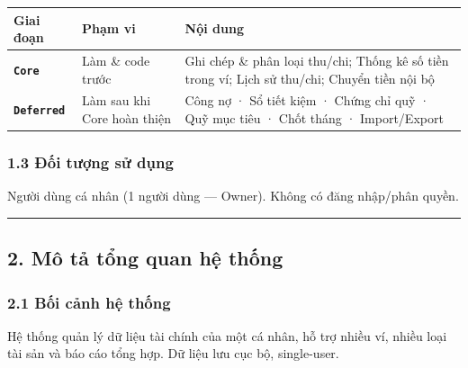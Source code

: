 \documentclass[11pt,a4paper]{article}
\newcounter{none}
\newcommand{\faintline}{\noalign{\global\arrayrulecolor{faintgray}}\hline\noalign{\global\arrayrulecolor{black}}} %
\begin{document}
{\def\LTcaptype{none}
\begin{longtable}[]{@{}
  >{\raggedright\arraybackslash}p{}
  >{\raggedright\arraybackslash}p{}
  >{\raggedright\arraybackslash}p{}@{}}
\toprule\noalign{}
\begin{minipage}[b]{\linewidth}\raggedright
Giai đoạn
\end{minipage} & \begin{minipage}[b]{\linewidth}\raggedright
Phạm vi
\end{minipage} & \begin{minipage}[b]{\linewidth}\raggedright
Nội dung
\end{minipage} \\
\midrule\noalign{}
\endhead
\bottomrule\noalign{}
\endlastfoot
\textbf{\texttt{Core}} & Làm \& code trước & Ghi chép \& phân loại thu/chi; Thống kê số tiền trong ví; Lịch sử thu/chi; Chuyển tiền nội bộ \\ \faintline
\textbf{\texttt{Deferred}} & Làm sau khi Core hoàn thiện & Công nợ · Sổ tiết kiệm · Chứng chỉ quỹ · Quỹ mục tiêu · Chốt tháng · Import/Export \\
\end{longtable}
}

\subsubsection{1.3 Đối tượng sử dụng}\label{ux111ux1ed1i-tux1b0ux1ee3ng-sux1eed-dux1ee5ng}

Người dùng cá nhân (1 người dùng --- Owner). Không có đăng nhập/phân quyền.

\begin{center}\rule{1.0\linewidth}{0.5pt}\end{center}

\subsection{2. Mô tả tổng quan hệ thống}\label{muxf4-tux1ea3-tux1ed5ng-quan-hux1ec7-thux1ed1ng}

\subsubsection{2.1 Bối cảnh hệ thống}\label{bux1ed1i-cux1ea3nh-hux1ec7-thux1ed1ng}

Hệ thống quản lý dữ liệu tài chính của một cá nhân, hỗ trợ nhiều ví,
nhiều loại tài sản và báo cáo tổng hợp. Dữ liệu lưu cục bộ, single-user.
\end{document}
